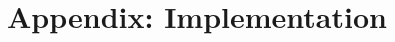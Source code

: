 \documentclass[oneside]{article}
\begin{document}
% 
% 
% 
% 

\section{Appendix: Implementation}
\end{document}
